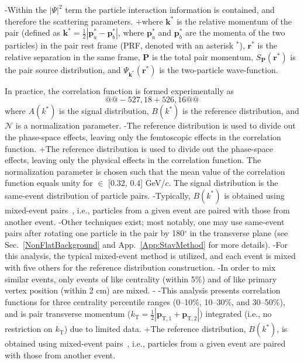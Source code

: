 -Within the $|\Psi|^{2}$ term the particle interaction information is contained, and therefore the scattering parameters.
+where $\mathbf{k}^{*}$ is the relative momentum of the pair (defined as $\mathbf{k}^{*} = \frac{1}{2}|\mathbf{p}_{a}^{*}-\mathbf{p}_{b}^{*}|$, where $\mathbf{p}_{a}^{*}$ and $\mathbf{p}_{b}^{*}$ are the momenta of the two particles) in the pair rest frame (PRF, denoted with an asterisk $^{*}$), $\mathbf{r}^{*}$ is the relative separation in the same frame, $\mathbf{P}$ is the total pair momentum, $S_{\mathbf{P}}(\mathbf{r^{*}})$ is the pair source distribution, and $\Psi_{\mathbf{k^{*}}}(\mathbf{r^{*}})$ is the two-particle wave-function.
 
 In practice, the correlation function is formed experimentally as
 \begin{equation}
@@ -527,18 +526,16 @@
 \label{eqn:CfExp}
 \end{equation}
 where $A(k^{*})$ is the signal distribution, $B(k^{*})$ is the reference distribution, and $\mathcal{N}$ is a normalization parameter.  
-The reference distribution is used to divide out the phase-space effects, leaving only the femtoscopic effects in the correlation function. 
+The reference distribution is used to divide out the phase-space effects, leaving only the physical effects in the correlation function. 
 The normalization parameter is chosen such that the mean value of the correlation function equals unity for \kstar $\in$ [0.32, 0.4] GeV/$c$.
 The signal distribution is the same-event distribution of particle pairs.
-Typically, $B(k^{*})$ is obtained using mixed-event pairs~\cite{Kopylov:1974th}, i.e., particles from a given event are paired with those from another event.
-Other techniques exist; most notably, one may use same-event pairs after rotating one particle in the pair by 180$^\circ$ in the transverse plane (see Sec.~\ref{NonFlatBackground} and App.~\ref{App:StavMethod} for more details).
-For this analysis, the typical mixed-event method is utilized, and each event is mixed with five others for the reference distribution construction.
-In order to mix similar events, only events of like centrality (within 5\%) and of like primary vertex position (within 2 cm) are mixed.
-
-This analysis presents correlation functions for three centrality percentile ranges (0--10\%, 10--30\%, and 30--50\%), and is pair transverse momentum ($k_{\mathrm{T}} = \frac{1}{2}|\mathbf{p}_{\mathrm{T,1}}+\mathbf{p}_{\mathrm{T,2}}|$) integrated (i.e., no restriction on $k_{\mathrm{T}}$) due to limited data.
+The reference distribution, $B(k^{*})$, is obtained using mixed-event pairs~\cite{Kopylov:1974th}, i.e., particles from a given event are paired with those from another event.
